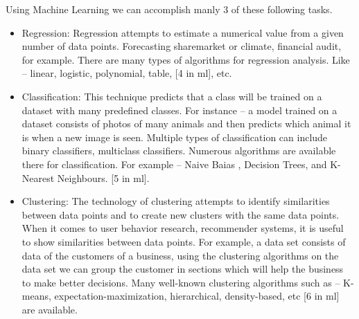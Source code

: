



Using Machine Learning we can accomplish manly 3 of these following tasks.
\begin{itemize}
\item Regression: Regression attempts to estimate a numerical value from a given number of data points. Forecasting sharemarket or climate, financial audit, for example. There are many types of algorithms for regression analysis. Like – linear, logistic, polynomial, table, [4 in ml], etc.

\item Classification: This technique predicts that a class will be trained on a dataset with many predefined classes. For instance – a model trained on a dataset consists of photos of many animals and then predicts which animal it is when a new image is seen. Multiple types of classification can include binary classifiers, multiclass classifiers. Numerous algorithms are available there for classification. For example – Naive Baias , Decision Trees, and K-Nearest Neighbours. [5 in ml].

\item Clustering: The technology of clustering attempts to identify similarities between data points and to create new clusters with the same data points. When it comes to user behavior research, recommender systems, it is useful to show similarities between data points. For example, a data set consists of data of the customers of a business, using the clustering algorithms on the data set we can group the customer in sections which will help the business to make better decisions. Many well-known clustering algorithms such as – K-means, expectation-maximization, hierarchical, density-based, etc [6 in ml] are available.

\end{itemize}


